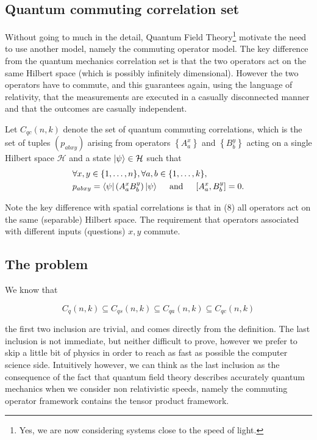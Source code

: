 
\subsection{Quantum commuting correlation set}\label{sec:quantum-commuting-correlation-set}
Without going to much in the detail, Quantum Field Theory\footnote{Yes, we are now considering systems close to the speed of light.} motivate the need to use another model, namely the commuting operator model. The key difference from the quantum mechanics correlation set is that the two operators act on the same Hilbert space (which is possibly infinitely dimensional). However the two operators have to commute, and this guarantees again, using the language of relativity, that the measurements are executed in a casually disconnected manner and that the outcomes are casually independent.


\begin{defn}
Let $C_{q c}(n, k)$ denote the set of quantum commuting correlations, which is the set of tuples $\left(p_{a b x y}\right)$ arising from operators $\left\{A_{a}^{x}\right\}$ and $\left\{B_{b}^{y}\right\}$ acting on a single Hilbert space $\mathcal{H}$ and a state $\ket{\psi} \in \mathcal{H}$ such that
\begin{equation}
    \begin{split}
&\forall x, y \in\{1, \ldots, n\}, \forall a, b \in\{1, \ldots, k\}, \quad \\
 &p_{a b x y}=\bra{\psi}\left(A_{a}^{x} B_{b}^{y}\right) \ket{\psi} \quad \text { and } \quad\left[A_{a}^{x}, B_{b}^{y}\right]=0 .
    \end{split}
\end{equation}
\end{defn}
Note the key difference with spatial correlations is that in (8) all operators act on the same (separable) Hilbert space. The requirement that operators associated with different inputs (questions) $x, y$ commute.
\subsection{The problem}

We know that

\begin{equation}
    C_{q}(n, k) \subseteq C_{q s}(n, k) \subseteq C_{q a}(n, k) \subseteq C_{q c}(n, k)
\end{equation}

the first two inclusion are trivial, and comes directly from the definition. The last inclusion is not immediate, but neither difficult to prove, however we prefer to skip a little bit of physics in order to reach as fast as possible the computer science side. Intuitively however, we can think as the last inclusion as the consequence of the fact that quantum field theory describes accurately quantum mechanics when we consider non relativistic speeds, namely the commuting operator framework contains the tensor product framework.

